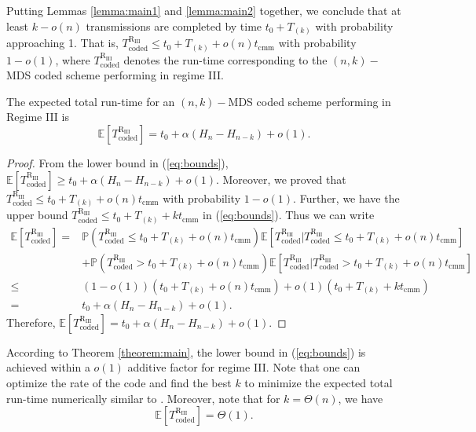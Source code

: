 \documentclass[onecolumn,journal,twoside]{IEEEtran}
\newcommand{\Prob}{\mathbb{P}}
\newcommand{\Expc}{\mathbb{E}}
\begin{document}
Putting Lemmas \ref{lemma:main1} and \ref{lemma:main2} together, we conclude that at least $k-o(n)$ transmissions are completed by time $t_0+T_{(k)}$ with probability approaching 1. That is, $T^{\text{R}_{\text{III}}}_{\text{coded}}\leq t_0+T_{(k)}+o(n)t_{\text{cmm}}$ with probability $1-o(1)$, where $T^{\text{R}_{\text{III}}}_{\text{coded}}$ denotes the run-time corresponding to the $(n,k)-$MDS coded scheme performing in regime III.

\begin{theorem}\label{theorem:main}
The expected total run-time for an $(n,k)-$MDS coded scheme performing in Regime III is 
\begin{equation}
    \Expc[T^{\text{R}_{\text{III}}}_{\text{coded}}]=t_0+\alpha (H_n - H_{n-k})+o(1).
\end{equation}
\end{theorem}

\begin{proof}
From the lower bound in (\ref{eq:bounds}), $\Expc[T^{\text{R}_{\text{III}}}_{\text{coded}}] \geq t_0+\alpha (H_n - H_{n-k}) + o(1)$. Moreover, we proved that $T^{\text{R}_{\text{III}}}_{\text{coded}}\leq t_0+T_{(k)}+o(n)t_{\text{cmm}}$ with probability $1-o(1)$. Further, we have the upper bound $T^{\text{R}_{\text{III}}}_{\text{coded}}\leq t_0+T_{(k)}+kt_{\text{cmm}}$ in (\ref{eq:bounds}). Thus we can write 
\begin{align}
\Expc[T^{\text{R}_{\text{III}}}_{\text{coded}}] =& \Prob(T^{\text{R}_{\text{III}}}_{\text{coded}}\leq t_0+T_{(k)}+o(n)t_{\text{cmm}}) \Expc[T^{\text{R}_{\text{III}}}_{\text{coded}}|T^{\text{R}_{\text{III}}}_{\text{coded}}\leq t_0+T_{(k)}+o(n)t_{\text{cmm}}] \nonumber\\
&+ \Prob(T^{\text{R}_{\text{III}}}_{\text{coded}} > t_0+T_{(k)}+o(n)t_{\text{cmm}}) \Expc[T^{\text{R}_{\text{III}}}_{\text{coded}}|T^{\text{R}_{\text{III}}}_{\text{coded}}> t_0+T_{(k)}+o(n)t_{\text{cmm}}]\nonumber\\
\leq & (1-o(1))(t_0+T_{(k)}+o(n)t_{\text{cmm}})+o(1)(t_0+T_{(k)}+kt_{\text{cmm}})\nonumber\\
=&t_0+\alpha (H_n - H_{n-k})+o(1).
\end{align}
Therefore, $\Expc[T^{\text{R}_{\text{III}}}_{\text{coded}}]=t_0+\alpha (H_n - H_{n-k})+o(1)$.
\end{proof}

According to Theorem \ref{theorem:main}, the lower bound in (\ref{eq:bounds}) is achieved within a $o(1)$ additive factor for regime III. Note that one can optimize the rate of the code and find the best $k$ to minimize the expected total run-time numerically similar to \cite{lee2016speeding}. Moreover, note that for $k=\Theta(n)$, we have 
\begin{equation}
    \Expc[T^{\text{R}_{\text{III}}}_{\text{coded}}]=\Theta(1).
\end{equation}
\end{document}

